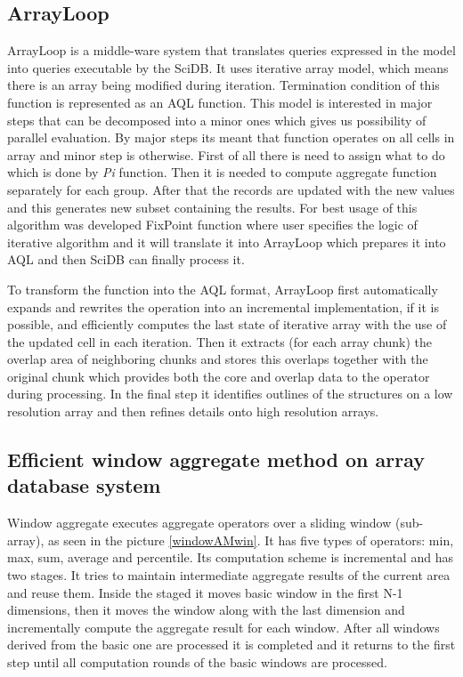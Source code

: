 \subsection{ArrayLoop}
ArrayLoop is a middle-ware system that translates queries expressed in the model into queries executable by the SciDB. It uses iterative array model, which means there is an array being modified during iteration. Termination condition of this function is represented as an AQL function. This model is interested in major steps that can be decomposed into a minor ones which gives us possibility of parallel evaluation. By major steps its meant that function operates on all cells in array and minor step is otherwise. First of all there is need to assign what to do which is done by \textit{Pi} function. Then it is needed to compute aggregate function separately for each group. After that the records are updated with the new values and this generates new subset containing the results.
For best usage of this algorithm was developed FixPoint function where user specifies the logic of iterative algorithm and it will translate it into ArrayLoop which prepares it into AQL and then SciDB can finally process it.

To transform the function into the AQL format, ArrayLoop first automatically expands and rewrites the operation into an incremental implementation, if it is possible, and efficiently computes the last state of iterative array with the use of the updated cell in each iteration. Then it extracts (for each array chunk) the overlap area of neighboring chunks and stores this overlaps together with the original chunk which provides both the core and overlap data to the operator during processing. In the final step it identifies outlines of the structures on a low resolution array and then refines details onto high resolution arrays. \cite{arrayloop}

\subsection{Efficient window aggregate method on array database system}
Window aggregate executes aggregate operators over a sliding window (sub-array), as seen in the picture \ref{windowAMwin}. It has five types of operators: min, max, sum, average and percentile.
Its computation scheme is incremental and has two stages. It tries to maintain intermediate aggregate results of the current area and reuse them. Inside the staged it moves basic window in the first N-1 dimensions, then it moves the window along with the last dimension and incrementally compute the aggregate result for each window. After all windows derived from the basic one are processed it is completed and it returns to the first step until all computation rounds of the basic windows are processed.

